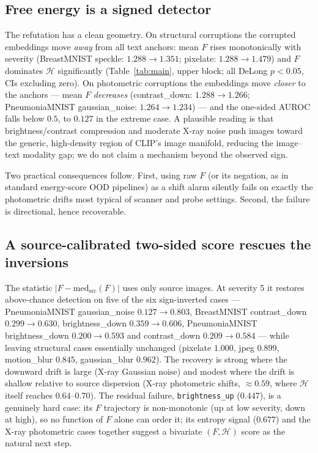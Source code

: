 \documentclass[11pt]{article}
\newcommand{\Hent}{\mathcal{H}}
\begin{document}
\subsection{Free energy is a signed detector}
\label{sec:signed}

The refutation has a clean geometry. On structural corruptions the corrupted
embeddings move \emph{away} from all text anchors: mean $F$ rises
monotonically with severity (BreastMNIST speckle: $1.288\!\to\!1.351$;
pixelate: $1.288\!\to\!1.479$) and $F$ dominates $\Hent$ significantly
(Table~\ref{tab:main}, upper block; all DeLong $p<0.05$, CIs excluding zero).
On photometric corruptions the embeddings move \emph{closer} to the anchors
--- mean $F$ \emph{decreases} (contrast\_down: $1.288\!\to\!1.266$;
PneumoniaMNIST gaussian\_noise: $1.264\!\to\!1.234$) --- and the one-sided
AUROC falls below $0.5$, to $0.127$ in the extreme case. A plausible reading
is that brightness/contrast compression and moderate X-ray noise push images
toward the generic, high-density region of CLIP's image manifold, reducing the
image--text modality gap; we do not claim a mechanism beyond the observed
sign.

Two practical consequences follow. First, using raw $F$ (or its negation, as
in standard energy-score OOD pipelines) as a shift alarm silently fails on
exactly the photometric drifts most typical of scanner and probe settings.
Second, the failure is directional, hence recoverable.

\subsection{A source-calibrated two-sided score rescues the inversions}
\label{sec:twosided}

The statistic $|F-\mathrm{med}_{\mathrm{src}}(F)|$ uses only source images.
At severity 5 it restores above-chance detection on five of the six
sign-inverted cases --- PneumoniaMNIST gaussian\_noise
$0.127\!\to\!0.803$, BreastMNIST contrast\_down $0.299\!\to\!0.630$,
brightness\_down $0.359\!\to\!0.606$, PneumoniaMNIST brightness\_down
$0.200\!\to\!0.593$ and contrast\_down $0.209\!\to\!0.584$ ---
while leaving structural cases essentially unchanged (pixelate $1.000$,
jpeg $0.899$, motion\_blur $0.845$, gaussian\_blur $0.962$). The recovery is
strong where the downward drift is large (X-ray Gaussian noise) and modest
where the drift is shallow relative to source dispersion (X-ray photometric
shifts, $\approx\!0.59$, where $\Hent$ itself reaches $0.64$--$0.70$).
The residual failure,
\texttt{brightness\_up} ($0.447$), is a genuinely hard case: its $F$
trajectory is non-monotonic (up at low severity, down at high), so no
function of $F$ alone can order it; its entropy signal ($0.677$) and the
X-ray photometric cases together suggest a bivariate $(F,\Hent)$ score as the
natural next step.
\end{document}
